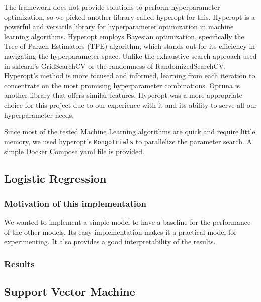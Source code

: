 \documentclass{article}
\begin{document}
    The framework does not provide solutions to perform hyperparameter optimization, so we picked another library called hyperopt for this.
    Hyperopt is a powerful and versatile library for hyperparameter optimization in machine learning algorithms.
    Hyperopt employs Bayesian optimization, specifically the Tree of Parzen Estimators (TPE) algorithm, which stands out for its efficiency in navigating the hyperparameter space.
    Unlike the exhaustive search approach used in sklearn's GridSearchCV or the randomness of RandomizedSearchCV, Hyperopt's method is more focused and informed, learning from each iteration to concentrate on the most promising hyperparameter combinations.
    Optuna is another library that offers similar features.
    Hyperopt was a more appropriate choice for this project due to our experience with it and its ability to serve all our hyperparameter needs.

    Since most of the tested Machine Learning algorithms are quick and require little memory, we used hyperopt's \texttt{MongoTrials} to parallelize the parameter search.
    A simple Docker Compose yaml file is provided.


    \subsection{Logistic Regression}\label{subsec:logistic-regression}

    \subsubsection{Motivation of this implementation}
    We wanted to implement a simple model to have a baseline for the performance of the other models.
    Its easy implementation makes it a practical model for experimenting.
    It also provides a good interpretability of the results.

    \subsubsection{Results}

    \subsection{Support Vector Machine}\label{subsec:support-vector-machine}
\end{document}

